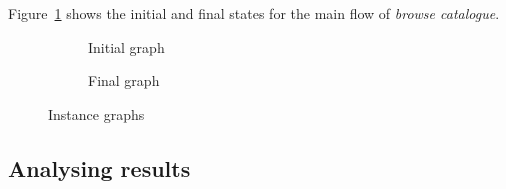 \begin{example} Figure~\ref{fig:tests:graphs} shows the initial and final states for the main flow of \emph{browse catalogue}.

\begin{figure}[!ht]
  \centering
  \begin{subfigure}[t]{.5\textwidth}
    \centerline{}
    \caption{Initial graph}
  \end{subfigure}%
  \begin{subfigure}[t]{.5\textwidth}
    \centerline{}
    \caption{Final graph}
  \end{subfigure}
  \caption{Instance graphs}\label{fig:tests:graphs}
\end{figure}
\end{example}

\subsection{Analysing results}

